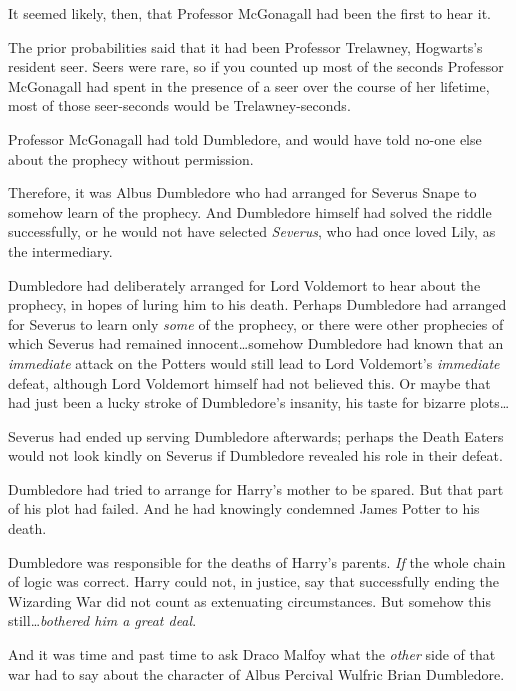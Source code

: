 It seemed likely, then, that Professor McGonagall had been the first to hear it.

The prior probabilities said that it had been Professor Trelawney, Hogwarts’s resident seer. Seers were rare, so if you counted up most of the seconds Professor McGonagall had spent in the presence of a seer over the course of her lifetime, most of those seer-seconds would be Trelawney-seconds.

Professor McGonagall had told Dumbledore, and would have told no-one else about the prophecy without permission.

Therefore, it was Albus Dumbledore who had arranged for Severus Snape to somehow learn of the prophecy. And Dumbledore himself had solved the riddle successfully, or he would not have selected \emph{Severus}, who had once loved Lily, as the intermediary.

Dumbledore had deliberately arranged for Lord Voldemort to hear about the prophecy, in hopes of luring him to his death. Perhaps Dumbledore had arranged for Severus to learn only \emph{some} of the prophecy, or there were other prophecies of which Severus had remained innocent…somehow Dumbledore had known that an \emph{immediate} attack on the Potters would still lead to Lord Voldemort’s \emph{immediate} defeat, although Lord Voldemort himself had not believed this. Or maybe that had just been a lucky stroke of Dumbledore’s insanity, his taste for bizarre plots…

Severus had ended up serving Dumbledore afterwards; perhaps the Death Eaters would not look kindly on Severus if Dumbledore revealed his role in their defeat.

Dumbledore had tried to arrange for Harry’s mother to be spared. But that part of his plot had failed. And he had knowingly condemned James Potter to his death.

Dumbledore was responsible for the deaths of Harry’s parents. \emph{If} the whole chain of logic was correct. Harry could not, in justice, say that successfully ending the Wizarding War did not count as extenuating circumstances. But somehow this still…\emph{bothered him a great deal}.

And it was time and past time to ask Draco Malfoy what the \emph{other} side of that war had to say about the character of Albus Percival Wulfric Brian Dumbledore.

